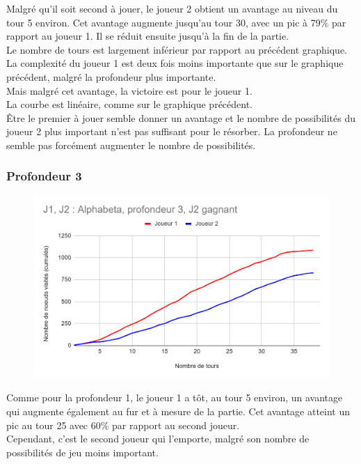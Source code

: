\documentclass[12pt]{article}
\begin{document}
Malgré qu’il soit second à jouer, le joueur 2 obtient un avantage au niveau du tour 5 environ. Cet avantage augmente jusqu’au tour 30, avec un pic à 79\% par rapport au joueur 1. Il se réduit ensuite jusqu’à la fin de la partie.\\
Le nombre de tours est largement inférieur par rapport au précédent graphique. La complexité du joueur 1 est deux fois moins importante que sur le graphique précédent, malgré la profondeur plus importante.\\
Mais malgré cet avantage, la victoire est pour le joueur 1.\\

La courbe est linéaire, comme sur le graphique précédent.\\
Être le premier à jouer semble donner un avantage et le nombre de possibilités du joueur 2 plus important n’est pas suffisant pour le résorber. La profondeur ne semble pas forcément augmenter le nombre de possibilités.
\newpage
\subsubsection{Profondeur 3}

\begin{figure}[!h]
   \includegraphics[width=\textwidth]{prof3alphabeta.png}
\end{figure}

Comme pour la profondeur 1, le joueur 1 a tôt, au tour 5 environ, un avantage qui augmente également au fur et à mesure de la partie. Cet avantage atteint un pic au tour 25 avec 60\% par rapport au second joueur.\\
Cependant, c'est le second joueur qui l'emporte, malgré son nombre de possibilités de jeu moins important.\\
\end{document}

